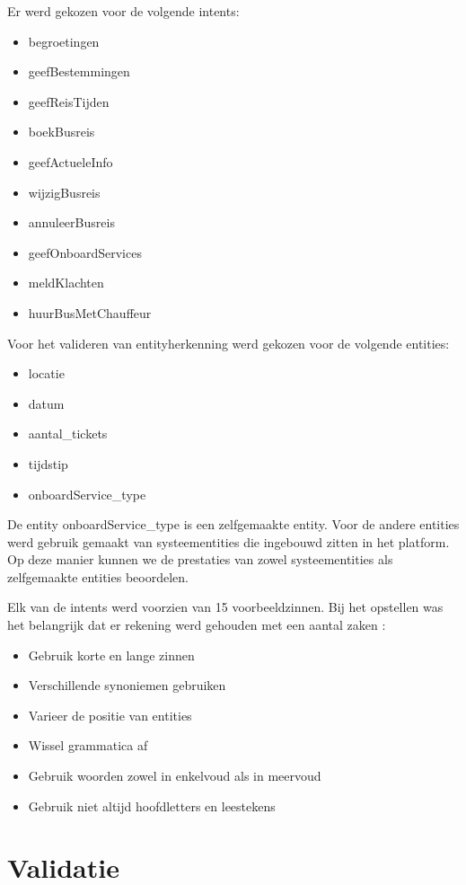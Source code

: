 Er werd gekozen voor de volgende intents:
\begin{itemize}
    \item begroetingen
    \item geefBestemmingen
    \item geefReisTijden
    \item boekBusreis
    \item geefActueleInfo
    \item wijzigBusreis
    \item annuleerBusreis
    \item geefOnboardServices
    \item meldKlachten
    \item huurBusMetChauffeur
\end{itemize}

Voor het valideren van entityherkenning werd gekozen voor de volgende entities:
\begin{itemize}
    \item locatie
    \item datum
    \item aantal\_tickets
    \item tijdstip
    \item onboardService\_type
\end{itemize}

De entity onboardService\_type is een zelfgemaakte entity. Voor de andere entities werd gebruik gemaakt van systeementities die ingebouwd zitten in het platform. Op deze manier kunnen we de prestaties van zowel systeementities als zelfgemaakte entities beoordelen.


Elk van de intents werd voorzien van 15 voorbeeldzinnen. Bij het opstellen was het belangrijk dat er rekening werd gehouden met een aantal zaken \autocite{Greyling2019}:
\begin{itemize}
    \item Gebruik korte en lange zinnen
    \item Verschillende synoniemen gebruiken
    \item Varieer de positie van entities
    \item Wissel grammatica af
    \item Gebruik woorden zowel in enkelvoud als in meervoud
    \item Gebruik niet altijd hoofdletters en leestekens
\end{itemize}

\section{Validatie}
\label{sec:validatie}


